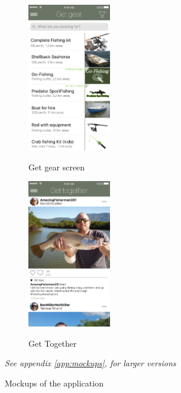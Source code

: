 \begin{figure}[t!]
\begin{subfigure}[t]{0.2\textwidth}
  	  \includegraphics[width=0.4\textwidth]{images/Get_gear.png}
  	  \label{fig:f3}
   	  \caption{Get gear screen}
  \end{subfigure}  
  \hfill
  \begin{subfigure}[t]{0.2\textwidth}
  	  \centering
  	  \includegraphics[width=0.4\textwidth]{images/Together.png}
  	  \label{fig:f4}
   	  \caption{Get Together}
  \end{subfigure}
  \hfill
  \newline
  \caption{Mockups of the application}
  \textit{See appendix \ref{app:mockups}, for larger versions}
 \end{figure}

